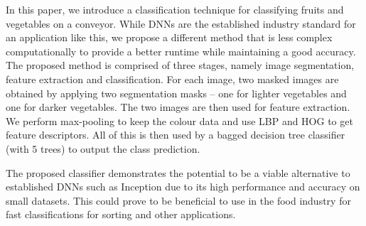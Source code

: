 In this paper, we introduce a classification technique for classifying fruits and vegetables on a conveyor. While DNNs are the established industry standard for an application like this, we propose a different method that is less complex computationally to provide a better runtime while maintaining a good accuracy. The proposed method is comprised of three stages, namely image segmentation, feature extraction and classification. For each image, two masked images are obtained by applying two segmentation masks -- one for lighter vegetables and one for darker vegetables. The two images are then used for feature extraction. We perform max-pooling to keep the colour data and use LBP and HOG to get feature descriptors. All of this is then used by a bagged decision tree classifier (with 5 trees) to output the class prediction.

The proposed classifier demonstrates the potential to be a viable alternative to established DNNs such as Inception due to its high performance and accuracy on small datasets. This could prove to be beneficial to use in the food industry for fast classifications for sorting and other applications.